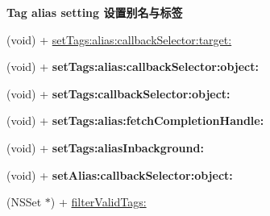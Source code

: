 \begin{Indent}\textbf{ Tag alias setting 设置别名与标签}\par
{\em 

 

 }\begin{DoxyCompactItemize}
\item 
(void) + \mbox{\hyperlink{interface_j_p_u_s_h_service_a9c53d751eccc46892d03a4cd50380ed4}{set\+Tags\+:alias\+:callback\+Selector\+:target\+:}}
\item 
\mbox{\label{interface_j_p_u_s_h_service_ae2f61b6c48ea62beaa41c26a03f4123c}} 
(void) + {\bfseries set\+Tags\+:alias\+:callback\+Selector\+:object\+:}
\item 
\mbox{\label{interface_j_p_u_s_h_service_a124c288eb56fa9eabbfa09b77cd5fd01}} 
(void) + {\bfseries set\+Tags\+:callback\+Selector\+:object\+:}
\item 
\mbox{\label{interface_j_p_u_s_h_service_a7d28b3fdee14657e1c08a991f41bad16}} 
(void) + {\bfseries set\+Tags\+:alias\+:fetch\+Completion\+Handle\+:}
\item 
\mbox{\label{interface_j_p_u_s_h_service_a4c6042730dca7f881dd259dd6e9b2f4c}} 
(void) + {\bfseries set\+Tags\+:alias\+Inbackground\+:}
\item 
\mbox{\label{interface_j_p_u_s_h_service_ac008d505d9fabba54e6dfe337163532c}} 
(void) + {\bfseries set\+Alias\+:callback\+Selector\+:object\+:}
\item 
(N\+S\+Set $\ast$) + \mbox{\hyperlink{interface_j_p_u_s_h_service_a9e643240a63cbf4e3e3d1d073c027fe1}{filter\+Valid\+Tags\+:}}
\end{DoxyCompactItemize}
\end{Indent}
